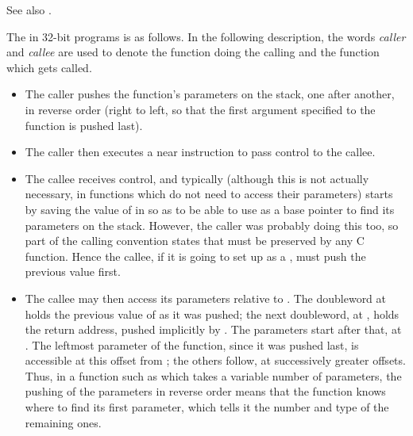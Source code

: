 See also .


The 
in 32-bit programs is as follows. In the following description,
the words \emph{caller} and \emph{callee} are used to denote
the function doing the calling and the function which gets called.

\begin{itemize}
    \item{The caller pushes the function's parameters on the stack, one
        after another, in reverse order (right to left, so that the first
        argument specified to the function is pushed last).}

    \item{The caller then executes a near  instruction to pass
        control to the callee.}

    \item{The callee receives control, and typically (although this
        is not actually necessary, in functions which do not need to
        access their parameters) starts by saving the value of 
        in  so as to be able to use  as a base pointer
        to find its parameters on the stack. However, the caller was
        probably doing this too, so part of the calling convention states
        that  must be preserved by any C function. Hence the
        callee, if it is going to set up  as a , must push the previous value first.}

    \item{The callee may then access its parameters relative to .
        The doubleword at \code{[EBP]} holds the previous value of
         as it was pushed; the next doubleword, at \code{[EBP+4]},
        holds the return address, pushed implicitly by .
        The parameters start after that, at \code{[EBP+8]}. The leftmost
        parameter of the function, since it was pushed last, is accessible
        at this offset from ; the others follow, at successively
        greater offsets. Thus, in a function such as  which
        takes a variable number of parameters, the pushing of the
        parameters in reverse order means that the function knows where
        to find its first parameter, which tells it the number and type
        of the remaining ones.}


\end{itemize}
